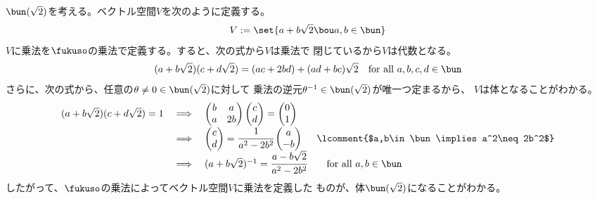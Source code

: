 {	\begin{example}[拡大体その一]\label{eg:拡大体その一} %
		$\bun(\sqrt{2})$を考える。ベクトル空間$V$を次のように定義する。
		\begin{equation*}\begin{split}
			V := \set{a + b\sqrt{2}\bou a,b\in\bun}
		\end{split}\end{equation*}
		$V$に乗法を$\fukuso$の乗法で定義する。すると、次の式から$V$は乗法で
		閉じているから$V$は代数となる。
		\begin{equation*}\begin{split}
			(a + b\sqrt{2})(c + d\sqrt{2}) = (ac + 2bd) + (ad + bc)\sqrt{2}
			\quad\text{for all } a,b,c,d\in\bun
		\end{split}\end{equation*}
		さらに、次の式から、任意の$\theta\neq0\in\bun(\sqrt{2})$に対して
		乗法の逆元$\theta^{-1}\in\bun(\sqrt{2})$が唯一つ定まるから、
		$V$は体となることがわかる。
		\begin{equation*}\begin{array}{rcll}
			(a + b\sqrt{2})(c + d\sqrt{2}) = 1
			&\implies& \begin{pmatrix}
				b & a \\ a & 2b
			\end{pmatrix}\begin{pmatrix}
				c \\ d
			\end{pmatrix} = \begin{pmatrix}
				0 \\ 1
			\end{pmatrix} \\
			&\implies& \begin{pmatrix}
				c \\ d
			\end{pmatrix} = \cfrac{1}{a^2 - 2b^2}\begin{pmatrix}
				a \\ -b
			\end{pmatrix} & \lcomment{$a,b\in\bun\implies a^2\neq 2b^2$} \\
			&\implies& (a + b\sqrt{2})^{-1} = \cfrac{a - b\sqrt{2}}{a^2 - 2b^2}
			& \quad\text{for all } a,b\in\bun
		\end{array}\end{equation*}
		したがって、$\fukuso$の乗法によってベクトル空間$V$に乗法を定義した
		ものが、体$\bun(\sqrt{2})$になることがわかる。
	\end{example} %

}
